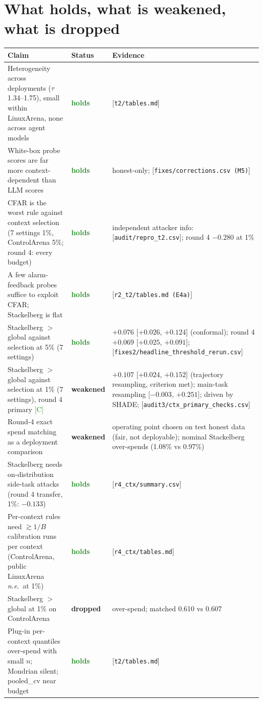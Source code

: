 \documentclass[11pt]{article}
\newcommand{\tC}{\textsf{\scriptsize\textcolor{ForestGreen}{[C]}}\xspace}
\newcommand{\src}[1]{{\footnotesize\textcolor{ink2}{[\nolinkurl{#1}]}}}
\newcommand{\HOLD}{\textcolor{ForestGreen}{\textbf{holds}}}
\newcommand{\WEAK}{\textcolor{BurntOrange}{\textbf{weakened}}}
\newcommand{\DROP}{\textcolor{BrickRed}{\textbf{dropped}}}
\newcommand{\NE}{\textit{n.e.}}
\begin{document}
\section{What holds, what is weakened, what is dropped}\label{sec:verdicts}
\begingroup\footnotesize
\begin{xltabular}{\linewidth}{@{}>{\raggedright\arraybackslash}X>{\raggedright\arraybackslash}p{1.8cm}>{\raggedright\arraybackslash}p{4.4cm}@{}}
\toprule
Claim & Status & Evidence\\
\midrule
\endhead
Heterogeneity across deployments ($\tau$ 1.34--1.75), small within LinuxArena, none across agent models & \HOLD & \src{t2/tables.md}\\
White-box probe scores are far more context-dependent than LLM scores & \HOLD & honest-only; \src{fixes/corrections.csv (M5)}\\
CFAR is the worst rule against context selection (7 settings 1\%, ControlArena 5\%; round 4: every budget) & \HOLD & independent attacker info: \src{audit/repro_t2.csv}; round 4 $-0.280$ at 1\%\\
A few alarm-feedback probes suffice to exploit CFAR; Stackelberg is flat & \HOLD & \src{r2_t2/tables.md (E4a)}\\
Stackelberg $>$ global against selection at 5\% (7 settings) & \HOLD & $+0.076$ [$+0.026$, $+0.124$] (conformal); round 4 $+0.069$ [$+0.025$, $+0.091$]; \src{fixes2/headline_threshold_rerun.csv}\\
Stackelberg $>$ global against selection at 1\% (7 settings), round 4 primary \tC & \WEAK & $+0.107$ [$+0.024$, $+0.152$] (trajectory resampling, criterion met); main-task resampling [$-0.003$, $+0.251$]; driven by SHADE; \src{audit3/ctx_primary_checks.csv}\\
Round-4 exact spend matching as a deployment comparison & \WEAK & operating point chosen on test honest data (fair, not deployable); nominal Stackelberg over-spends (1.08\% vs 0.97\%)\\
Stackelberg needs on-distribution side-task attacks (round 4 transfer, 1\%: $-0.133$) & \HOLD & \src{r4_ctx/summary.csv}\\
Per-context rules need $\gtrsim1/B$ calibration runs per context (ControlArena, public LinuxArena \NE\ at 1\%) & \HOLD & \src{r4_ctx/tables.md}\\
Stackelberg $>$ global at 1\% on ControlArena & \DROP & over-spend; matched 0.610 vs 0.607\\
Plug-in per-context quantiles over-spend with small $n$; Mondrian silent; pooled\_cv near budget & \HOLD & \src{t2/tables.md}\\

\end{xltabular}
\end{document}
